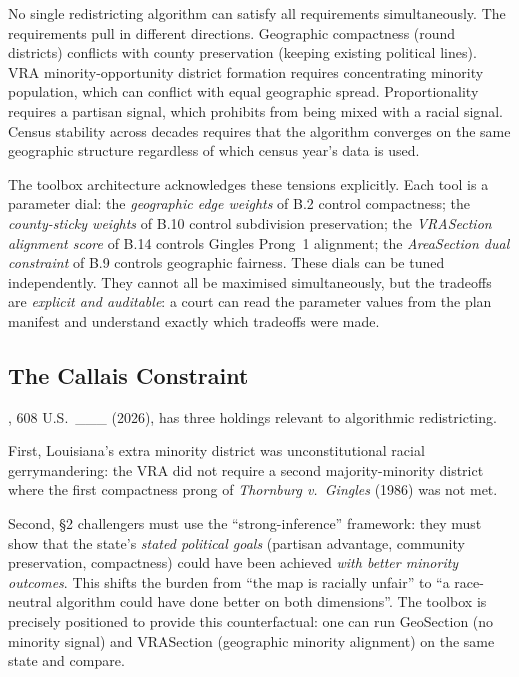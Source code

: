 No single redistricting algorithm can satisfy all requirements simultaneously.
The requirements pull in different directions.
Geographic compactness (round districts) conflicts with county preservation
(keeping existing political lines).
VRA minority-opportunity district formation requires concentrating minority
population, which can conflict with equal geographic spread.
Proportionality requires a partisan signal, which \callais{} prohibits from
being mixed with a racial signal.
Census stability across decades requires that the algorithm converges on the
same geographic structure regardless of which census year's data is used.

The toolbox architecture acknowledges these tensions explicitly.
Each tool is a parameter dial:
the \emph{geographic edge weights} of B.2 control compactness;
the \emph{county-sticky weights} of B.10 control subdivision preservation;
the \emph{VRASection alignment score} of B.14 controls Gingles Prong~1 alignment;
the \emph{AreaSection dual constraint} of B.9 controls geographic fairness.
These dials can be tuned independently.
They cannot all be maximised simultaneously, but the tradeoffs are \emph{explicit
and auditable}: a court can read the parameter values from the plan manifest and
understand exactly which tradeoffs were made.

\subsection{The Callais Constraint}

\callais{}, 608 U.S.\ \_\_\_ (2026), has three holdings relevant to algorithmic
redistricting.

First, Louisiana's extra minority district was unconstitutional racial
gerrymandering: the VRA did not require a second majority-minority district
where the first compactness prong of \emph{Thornburg v.\ Gingles} (1986) was
not met.

Second, \S2 challengers must use the ``strong-inference'' framework: they must
show that the state's \emph{stated political goals} (partisan advantage, community
preservation, compactness) could have been achieved \emph{with better minority
outcomes}.
This shifts the burden from ``the map is racially unfair'' to ``a race-neutral
algorithm could have done better on both dimensions''.
The toolbox is precisely positioned to provide this counterfactual: one can
run GeoSection (no minority signal) and VRASection (geographic minority alignment)
on the same state and compare.

